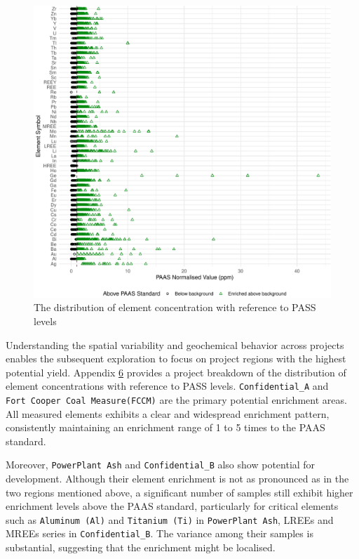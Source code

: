 \documentclass[11pt,a4paper,]{article}
\begin{document}
\begin{figure}
\includegraphics[width=1\linewidth,height=1\textheight]{Final_report_files/figure-latex/paaslvlcode-1} \caption{The distribution of element concentration with reference to PASS levels}\label{fig:paaslvlcode}
\end{figure}

Understanding the spatial variability and geochemical behavior across projects enables the subsequent exploration to focus on project regions with the highest potential yield. Appendix \href{\%7B\#appendix-six\%7D}{6} provides a project breakdown of the distribution of element concentrations with reference to PASS levels. \texttt{Confidential\_A} and \texttt{Fort\ Cooper\ Coal\ Measure(FCCM)} are the primary potential enrichment areas. All measured elements exhibits a clear and widespread enrichment pattern, consistently maintaining an enrichment range of 1 to 5 times to the PAAS standard.

Moreover, \texttt{PowerPlant\ Ash} and \texttt{Confidential\_B} also show potential for development. Although their element enrichment is not as pronounced as in the two regions mentioned above, a significant number of samples still exhibit higher enrichment levels above the PAAS standard, particularly for critical elements such as \texttt{Aluminum\ (Al)} and \texttt{Titanium\ (Ti)} in \texttt{PowerPlant\ Ash}, LREEs and MREEs series in \texttt{Confidential\_B}. The variance among their samples is substantial, suggesting that the enrichment might be localised.
\end{document}
